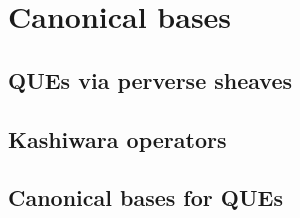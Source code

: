 \section{Canonical bases}
    \subsection{QUEs via perverse sheaves}
    
    \subsection{Kashiwara operators}
    
    \subsection{Canonical bases for QUEs}